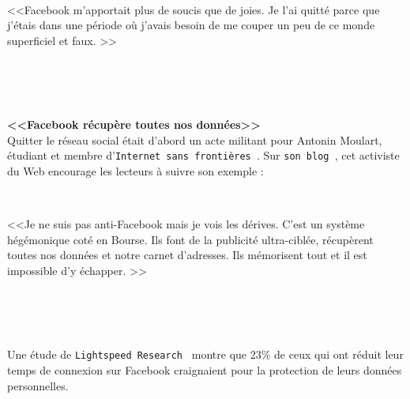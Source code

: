 \documentclass[11pt,twoside,a4paper]{article}
\begin{document}
\begin{minipage}[h]{0.10\textwidth} ~\\ \end{minipage} \hfill \begin{minipage}[h]{0.70\textwidth}
	<<Facebook m'apportait plus de soucis que de joies. Je l'ai quitt{\'e} parce que j'{\'e}tais dans une p{\'e}riode o{\`u} j'avais besoin de me couper un peu de ce monde superficiel et faux. >>
\end{minipage} \hfill \begin{minipage}[h]{0.15\textwidth} ~\\ \end{minipage} ~\\~\\

\textbf{<<Facebook r{\'e}cup{\`e}re toutes nos donn{\'e}es>>}~\\

Quitter le r{\'e}seau social {\'e}tait d'abord un acte militant pour Antonin Moulart, {\'e}tudiant et membre d'\texttt{Internet sans fronti{\`e}res~\footnotemark}. Sur \texttt{son blog~\footnotemark}, cet activiste du Web encourage les lecteurs {\`a} suivre son exemple : ~\\

\begin{minipage}[h]{0.10\textwidth} ~\\ \end{minipage} \hfill \begin{minipage}[h]{0.70\textwidth}
	<<Je ne suis pas anti-Facebook mais je vois les d{\'e}rives. C'est un syst{\`e}me h{\'e}g{\'e}monique cot{\'e} en Bourse. Ils font de la publicit{\'e} ultra-cibl{\'e}e, r{\'e}cup{\`e}rent toutes nos donn{\'e}es et notre carnet d'adresses. Ils m{\'e}morisent tout et il est impossible d'y {\'e}chapper. >>
\end{minipage} \hfill \begin{minipage}[h]{0.15\textwidth} ~\\ \end{minipage} ~\\~\\

Une {\'e}tude de \texttt{Lightspeed Research~\footnotemark} montre que 23\% de ceux qui ont r{\'e}duit leur temps de connexion sur Facebook craignaient pour la protection de leurs donn{\'e}es personnelles. ~\\
\end{document}
